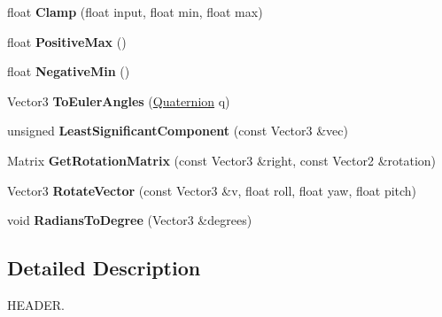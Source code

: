 \begin{DoxyCompactItemize}
\item 
\mbox{\label{namespaceMathUtil_a1a1efd5809a063ea299d7744072f66eb}} 
float {\bfseries Clamp} (float input, float min, float max)
\item 
\mbox{\label{namespaceMathUtil_af5453baa31b395918534a490030e2774}} 
float {\bfseries Positive\+Max} ()
\item 
\mbox{\label{namespaceMathUtil_afd73f68c1e5b898c7fe2bdafb38c1d10}} 
float {\bfseries Negative\+Min} ()
\item 
\mbox{\label{namespaceMathUtil_a2e91846f784bbe315eefa21a9ddbe255}} 
Vector3 {\bfseries To\+Euler\+Angles} (\hyperlink{structMathUtil_1_1Quaternion}{Quaternion} q)
\item 
\mbox{\label{namespaceMathUtil_a22625ffcee253816dc713e25ff712137}} 
unsigned {\bfseries Least\+Significant\+Component} (const Vector3 \&vec)
\item 
\mbox{\label{namespaceMathUtil_a133a83e16c84261f8d01b8246ec2d2fa}} 
Matrix {\bfseries Get\+Rotation\+Matrix} (const Vector3 \&right, const Vector2 \&rotation)
\item 
\mbox{\label{namespaceMathUtil_af55c8072a12d6f24e8684e50415b4680}} 
Vector3 {\bfseries Rotate\+Vector} (const Vector3 \&v, float roll, float yaw, float pitch)
\item 
\mbox{\label{namespaceMathUtil_acd7c6998fc267fa6221e9530925b443c}} 
void {\bfseries Radians\+To\+Degree} (Vector3 \&degrees)
\end{DoxyCompactItemize}


\subsection{Detailed Description}
H\+E\+A\+D\+ER. 